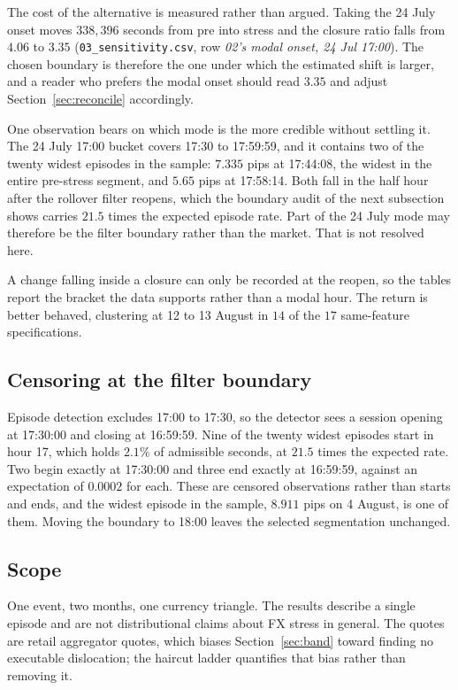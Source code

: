 \documentclass[11pt,a4paper]{article}
\newcommand{\code}[1]{\texttt{\small #1}}
\begin{document}
The cost of the alternative is measured rather than argued. Taking the 24 July onset moves
$338{,}396$ seconds from pre into stress and the closure ratio falls from $4.06$ to $3.35$
(\code{03\_sensitivity.csv}, row \emph{02's modal onset, 24 Jul 17:00}). The chosen boundary
is therefore the one under which the estimated shift is larger, and a reader who prefers
the modal onset should read $3.35$ and adjust Section~\ref{sec:reconcile} accordingly.

One observation bears on which mode is the more credible without settling it. The
24 July 17:00 bucket covers 17:30 to 17:59:59, and it contains two of the twenty widest
episodes in the sample: $7.335$ pips at 17:44:08, the widest in the entire pre-stress
segment, and $5.65$ pips at 17:58:14. Both fall in the half hour after the rollover filter
reopens, which the boundary audit of the next subsection shows carries $21.5$ times the
expected episode rate. Part of the 24 July mode may therefore be the filter boundary rather
than the market. That is not resolved here.

A change falling inside a closure can only be recorded at the reopen, so the tables report
the bracket the data supports rather than a modal hour. The return is better behaved,
clustering at 12 to 13 August in $14$ of the $17$ same-feature specifications.

\subsection{Censoring at the filter boundary}

Episode detection excludes 17:00 to 17:30, so the detector sees a session opening at
17:30:00 and closing at 16:59:59. Nine of the twenty widest episodes start in hour 17, which
holds $2.1\%$ of admissible seconds, at $21.5$ times the expected rate. Two begin exactly at
17:30:00 and three end exactly at 16:59:59, against an expectation of $0.0002$ for each.
These are censored observations rather than starts and ends, and the widest episode in the
sample, $8.911$ pips on 4 August, is one of them. Moving the boundary to 18:00 leaves the
selected segmentation unchanged.

\subsection{Scope}

One event, two months, one currency triangle. The results describe a single episode and are
not distributional claims about FX stress in general. The quotes are retail aggregator
quotes, which biases Section~\ref{sec:band} toward finding no executable dislocation; the
haircut ladder quantifies that bias rather than removing it.
\end{document}
